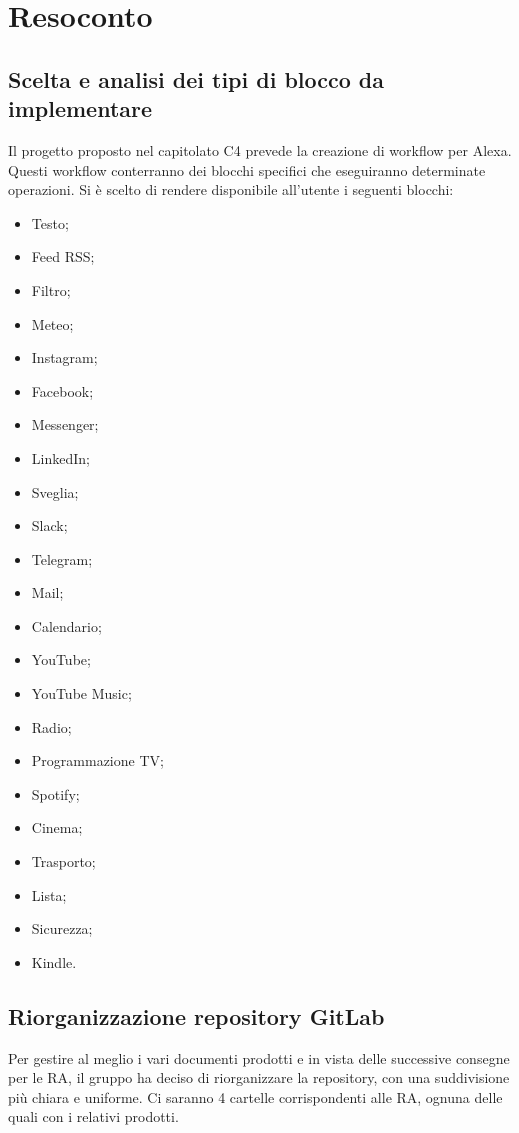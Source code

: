 \section{Resoconto}

    \subsection{Scelta e analisi dei tipi di blocco da implementare}
    Il progetto proposto nel capitolato C4 prevede la creazione di workflow per Alexa. Questi workflow conterranno dei blocchi specifici che eseguiranno determinate operazioni. Si è scelto di rendere disponibile all'utente i seguenti blocchi:
    \begin{itemize}
        \item Testo;
        \item Feed RSS;
        \item Filtro;
        \item Meteo;
        \item Instagram;
        \item Facebook;
        \item Messenger;
        \item LinkedIn;
        \item Sveglia;
        \item Slack;
        \item Telegram;
        \item Mail;
        \item Calendario;
        \item YouTube;
        \item YouTube Music;
        \item Radio;
        \item Programmazione TV;
        \item Spotify;
        \item Cinema;
        \item Trasporto;
        \item Lista;
        \item Sicurezza;
        \item Kindle.
    \end{itemize}

    \subsection{Riorganizzazione repository GitLab}
    Per gestire al meglio i vari documenti prodotti e in vista delle successive consegne per le RA, il gruppo ha deciso di riorganizzare la repository, con una suddivisione più chiara e uniforme. Ci saranno 4 cartelle corrispondenti alle RA, ognuna delle quali con i relativi prodotti.